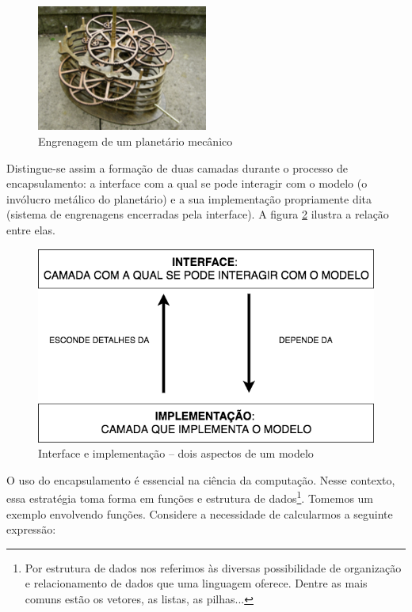 \begin{figure}[!htb]
	\caption{Engrenagem de um planetário mecânico}\label{fig:engine}
	\begin{center}
		\includegraphics[width=0.50\textwidth]{imagens/engine}
	\end{center}
\end{figure}

Distingue-se assim a formação de duas camadas durante o processo de encapsulamento: a interface com a qual se pode interagir com o modelo (o invólucro metálico do planetário) e a sua implementação propriamente dita (sistema de engrenagens encerradas pela interface). A figura \ref{fig:encapsulamento} ilustra a relação entre elas.

\begin{figure}[!htb]
	\caption{Interface e implementação -- dois aspectos de um modelo}\label{fig:encapsulamento}
	\begin{center}
		\includegraphics[scale=0.55]{imagens/encapsulamento}
	\end{center}
\end{figure}

O uso do encapsulamento é essencial na ciência da computação. Nesse contexto, essa estratégia toma forma em funções e estrutura de dados\footnote{Por estrutura de dados nos referimos às diversas possibilidade de organização e relacionamento de dados que uma linguagem oferece. Dentre as mais comuns estão os vetores, as listas, as pilhas...}. Tomemos um exemplo envolvendo funções. Considere a necessidade de calcularmos a seguinte expressão: 

